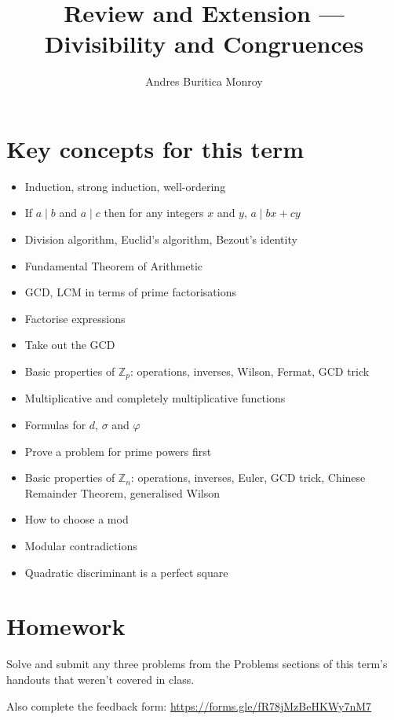 \documentclass{article}
\title{Review and Extension --- Divisibility and Congruences}
\author{Andres Buritica Monroy}
\date{}
\begin{document}
\maketitle
\section{Key concepts for this term}
\begin{itemize}
	\item Induction, strong induction, well-ordering
	\item If $a\mid b$ and $a\mid c$ then for any integers $x$ and $y$, $a\mid
		      bx+cy$
	\item Division algorithm, Euclid's algorithm, Bezout's identity
	\item Fundamental Theorem of Arithmetic
	\item GCD, LCM in terms of prime factorisations
	\item Factorise expressions
	\item Take out the GCD
	\item Basic properties of $\mathbb Z_p$: operations, inverses, Wilson,
	      Fermat, GCD trick
	\item Multiplicative and completely multiplicative functions
	\item Formulas for $d$, $\sigma$ and $\varphi$
	\item Prove a problem for prime powers first
	\item Basic properties of $\mathbb Z_n$: operations, inverses,
	      Euler, GCD trick, Chinese Remainder Theorem, generalised Wilson
	\item How to choose a mod
	\item Modular contradictions
	\item Quadratic discriminant is a perfect square
\end{itemize}
\section{Homework}
Solve and submit any three problems from the Problems sections of this term’s handouts that
weren’t covered in class.

Also complete the feedback form: \url{https://forms.gle/fR78jMzBeHKWy7nM7}
\end{document}
